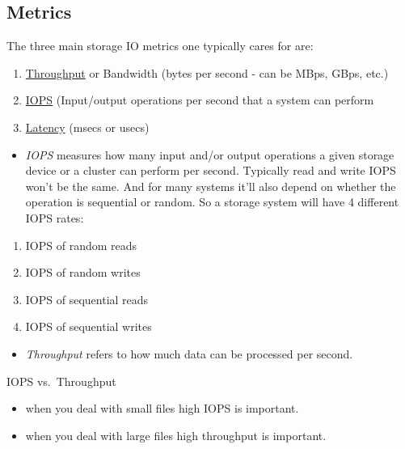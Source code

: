 \documentclass[
]{report}
\providecommand{\tightlist}{%
  \setlength{\itemsep}{0pt}\setlength{\parskip}{0pt}}\usepackage{longtable,booktabs,array}
\begin{document}
\subsection{Metrics}\label{metrics}

The three main storage IO metrics one typically cares for are:

\begin{enumerate}
\def\labelenumi{\arabic{enumi}.}
\tightlist
\item
  \href{https://en.wikipedia.org/wiki/Network_throughput}{Throughput} or
  Bandwidth (bytes per second - can be MBps, GBps, etc.)
\item
  \href{https://en.wikipedia.org/wiki/IOPS}{IOPS} (Input/output
  operations per second that a system can perform
\item
  \href{https://en.wikipedia.org/wiki/Latency_(engineering)}{Latency}
  (msecs or usecs)
\end{enumerate}

\begin{itemize}
\tightlist
\item
  \emph{IOPS} measures how many input and/or output operations a given
  storage device or a cluster can perform per second. Typically read and
  write IOPS won't be the same. And for many systems it'll also depend
  on whether the operation is sequential or random. So a storage system
  will have 4 different IOPS rates:
\end{itemize}

\begin{enumerate}
\def\labelenumi{\arabic{enumi}.}
\tightlist
\item
  IOPS of random reads
\item
  IOPS of random writes
\item
  IOPS of sequential reads
\item
  IOPS of sequential writes
\end{enumerate}

\begin{itemize}
\tightlist
\item
  \emph{Throughput} refers to how much data can be processed per second.
\end{itemize}

IOPS vs.~Throughput

\begin{itemize}
\tightlist
\item
  when you deal with small files high IOPS is important.
\item
  when you deal with large files high throughput is important.
\end{itemize}
\end{document}
